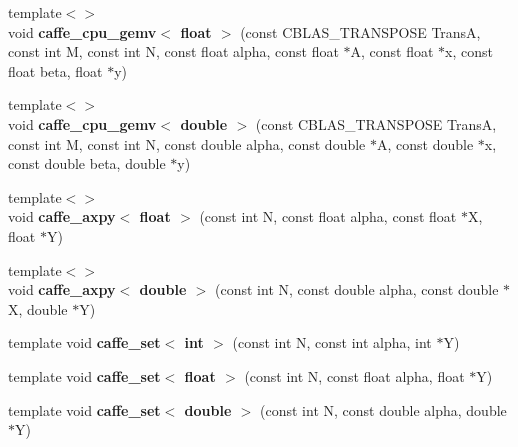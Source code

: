 \begin{DoxyCompactItemize}
\item 
{\footnotesize template$<$$>$ }\\void {\bfseries caffe\+\_\+cpu\+\_\+gemv$<$ float $>$} (const C\+B\+L\+A\+S\+\_\+\+T\+R\+A\+N\+S\+P\+O\+SE TransA, const int M, const int N, const float alpha, const float $\ast$A, const float $\ast$x, const float beta, float $\ast$y)\hypertarget{namespacecaffe_ab5a4363a871d7f6efa2d0fb201ca986a}{}\label{namespacecaffe_ab5a4363a871d7f6efa2d0fb201ca986a}

\item 
{\footnotesize template$<$$>$ }\\void {\bfseries caffe\+\_\+cpu\+\_\+gemv$<$ double $>$} (const C\+B\+L\+A\+S\+\_\+\+T\+R\+A\+N\+S\+P\+O\+SE TransA, const int M, const int N, const double alpha, const double $\ast$A, const double $\ast$x, const double beta, double $\ast$y)\hypertarget{namespacecaffe_afd43f6e27055e68628f6eb42f8416407}{}\label{namespacecaffe_afd43f6e27055e68628f6eb42f8416407}

\item 
{\footnotesize template$<$$>$ }\\void {\bfseries caffe\+\_\+axpy$<$ float $>$} (const int N, const float alpha, const float $\ast$X, float $\ast$Y)\hypertarget{namespacecaffe_aaa105c828f9c1423a07a6edbf9dd44cd}{}\label{namespacecaffe_aaa105c828f9c1423a07a6edbf9dd44cd}

\item 
{\footnotesize template$<$$>$ }\\void {\bfseries caffe\+\_\+axpy$<$ double $>$} (const int N, const double alpha, const double $\ast$X, double $\ast$Y)\hypertarget{namespacecaffe_a1429069b15b332c453b637fda744bc81}{}\label{namespacecaffe_a1429069b15b332c453b637fda744bc81}

\item 
template void {\bfseries caffe\+\_\+set$<$ int $>$} (const int N, const int alpha, int $\ast$Y)\hypertarget{namespacecaffe_a4b6fe4799eef73c0c3e1647076a40e16}{}\label{namespacecaffe_a4b6fe4799eef73c0c3e1647076a40e16}

\item 
template void {\bfseries caffe\+\_\+set$<$ float $>$} (const int N, const float alpha, float $\ast$Y)\hypertarget{namespacecaffe_a674f08d34c3c699147783b92c237bb33}{}\label{namespacecaffe_a674f08d34c3c699147783b92c237bb33}

\item 
template void {\bfseries caffe\+\_\+set$<$ double $>$} (const int N, const double alpha, double $\ast$Y)\hypertarget{namespacecaffe_a5b38e7723533b807cf41eb6647f02032}{}\label{namespacecaffe_a5b38e7723533b807cf41eb6647f02032}


\end{DoxyCompactItemize}
